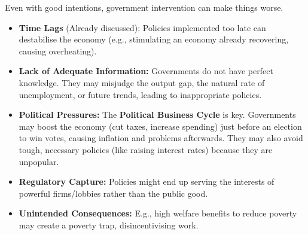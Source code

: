 \documentclass[11pt, a4paper, twoside]{book}
\begin{document}
Even with good intentions, government intervention can make things worse.

\begin{itemize}
  \item \textbf{Time Lags} (Already discussed): Policies implemented too late can destabilise the economy (e.g., stimulating an economy already recovering, causing overheating).
  \item \textbf{Lack of Adequate Information:} Governments do not have perfect knowledge. They may misjudge the output gap, the natural rate of unemployment, or future trends, leading to inappropriate policies.
  \item \textbf{Political Pressures:} The \textbf{Political Business Cycle} is key. Governments may boost the economy (cut taxes, increase spending) just before an election to win votes, causing inflation and problems afterwards. They may also avoid tough, necessary policies (like raising interest rates) because they are unpopular.
  \item \textbf{Regulatory Capture:} Policies might end up serving the interests of powerful firms/lobbies rather than the public good.
  \item \textbf{Unintended Consequences:} E.g., high welfare benefits to reduce poverty may create a poverty trap, disincentivising work.
\end{itemize}
\end{document}
